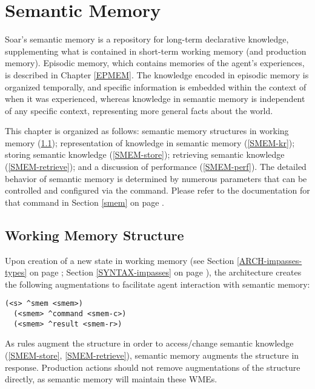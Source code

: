 \chapter{Semantic Memory}
\label{SMEM}

Soar's semantic memory is a repository for long-term declarative knowledge, supplementing what is contained in short-term working memory (and production memory). 
Episodic memory, which contains memories of the agent's experiences, is described in Chapter \ref{EPMEM}. 
The knowledge encoded in episodic memory is organized temporally, and specific information is embedded within the context of when it was experienced, whereas knowledge in semantic memory is independent of any specific context, representing more general facts about the world.

This chapter is organized as follows: semantic memory structures in working memory (\ref{SMEM-wm}); representation of knowledge in semantic memory (\ref{SMEM-kr}); storing semantic knowledge (\ref{SMEM-store}); retrieving semantic knowledge (\ref{SMEM-retrieve}); and a discussion of performance (\ref{SMEM-perf}). 
The detailed behavior of semantic memory is determined by numerous parameters that can be controlled and configured via the  command. 
Please refer to the documentation for that command in Section \ref{smem} on page \pageref{smem}.


\section{Working Memory Structure}
\label{SMEM-wm}

Upon creation of a new state in working memory (see Section \ref{ARCH-impasses-types} on page \pageref{ARCH-impasses-types}; Section \ref{SYNTAX-impasses} on page \pageref{SYNTAX-impasses}), the architecture creates the following augmentations to facilitate agent interaction with semantic memory:

\begin{verbatim}
(<s> ^smem <smem>)
  (<smem> ^command <smem-c>)
  (<smem> ^result <smem-r>)
\end{verbatim}

As rules augment the  structure in order to access/change semantic knowledge (\ref{SMEM-store}, \ref{SMEM-retrieve}), semantic memory augments the  structure in response.
Production actions should not remove augmentations of the  structure directly, as semantic memory will maintain these WMEs.



